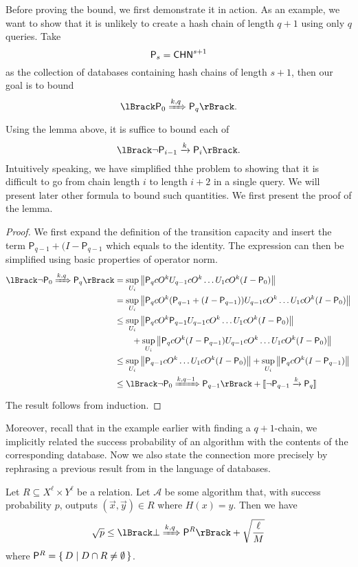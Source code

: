 Before proving the bound, we first demonstrate it in action.
As an example, we want to show that it is unlikely to create a hash chain of length $q+1$ using only $q$ queries.
Take
$$\mathsf{P}_s=\mathsf{CHN}^{s+1}$$
as the collection of databases containing hash chains of length $s+1$,
then our goal is to bound
$$\lBrack\sfP_0\xRightarrow{k,q}\sfP_q\rBrack.$$
Using the lemma above, it is suffice to bound each of
$$\lBrack\neg \sfP_{i-1}\xrightarrow{k}\sfP_i\rBrack.$$
Intuitively speaking, we have simplified thhe problem to showing that it is difficult to go from chain length $i$ to length $i+2$ in a single query.
We will present later other formula to bound such quantities.
We first present the proof of the lemma.

\begin{proof}
	We first expand the definition of the transition capacity and insert the term $\mathsf{P}_{q-1}+(I-\mathsf{P}_{q-1}$ which equals to the identity.
	The expression can then be simplified using basic properties of operator norm.
	\begin{align*}
		\lBrack\neg \mathsf{P}_0\xRightarrow{k,q}\mathsf{P}_q\rBrack
			&=\sup_{U_i}\norm{\mathsf{P}_q cO^k U_{q-1} cO^k\ldots U_1 cO^k (I-\mathsf{P}_0)} \\
			&=\sup_{U_i}\norm{\mathsf{P}_q cO^k (\mathsf{P}_{q-1}+(I-\mathsf{P}_{q-1})) U_{q-1} cO^k\ldots U_1 cO^k (I-\mathsf{P}_0)}\\
			&\leq\sup_{U_i}\norm{\mathsf{P}_q cO^k \mathsf{P}_{q-1} U_{q-1} cO^k\ldots U_1 cO^k (I-\mathsf{P}_0)}\\
			&\qquad+\sup_{U_i}\norm{\mathsf{P}_q cO^k (I-\mathsf{P}_{q-1}) U_{q-1} cO^k\ldots U_1 cO^k (I-\mathsf{P}_0)}\\
			&\leq\sup_{U_i} \norm{\mathsf{P}_{q-1} cO^k\ldots U_1 cO^k (I-\mathsf{P}_0)}+\sup_{U_i} \norm{\mathsf{P}_q cO^k (I-\mathsf{P}_{q-1})}\\
			&\leq\lBrack\neg \mathsf{P}_0\xRightarrow{k,q-1}\mathsf{P}_{q-1}\rBrack+[\![\neg \mathsf{P}_{q-1}\xrightarrow{k}\mathsf{P}_q]\!]
	\end{align*}
	The result follows from induction.
\end{proof}

Moreover, recall that in the example earlier with finding a $q+1$-chain,
we implicitly related the success probability of an algorithm with the contents of the corresponding database.
Now we also state the connection more precisely by rephrasing a previous result from \cite{compressed-oracles} in the language of databases.
\begin{thm}
	\label{zhandry-database}
	Let $R\subseteq X^\ell\times Y^\ell$ be a relation.
	Let $\mathcal{A}$ be some algorithm that, with success probability $p$, outputs $(\vec{x}, \vec{y})\in R$ where $H(x)=y$.
	Then we have
	$$\sqrt{p}\leq\lBrack\bot\xRightarrow{k, q} \mathsf{P}^R\rBrack+\sqrt{\frac{\ell}{M}}$$
	where $\mathsf{P}^R=\set{D | D\cap R\ne\emptyset}$.
\end{thm}

